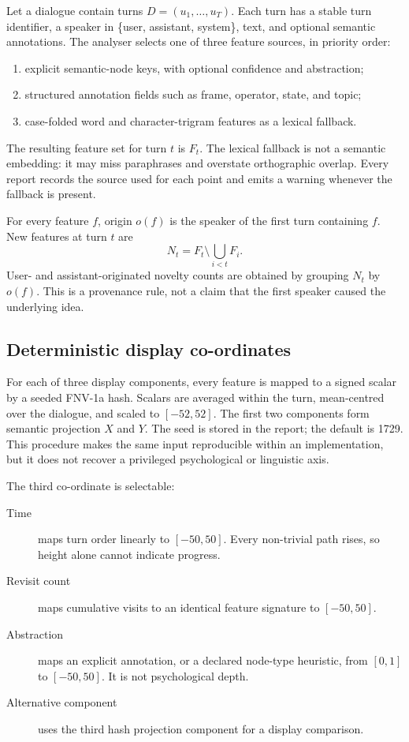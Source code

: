 \documentclass[11pt]{article}
\begin{document}
Let a dialogue contain turns $D=(u_1,\ldots,u_T)$. Each turn has a stable turn
identifier, a speaker in \{user, assistant, system\}, text, and optional semantic
annotations. The analyser selects one of three feature sources, in priority
order:

\begin{enumerate}
  \item explicit semantic-node keys, with optional confidence and abstraction;
  \item structured annotation fields such as frame, operator, state, and topic;
  \item case-folded word and character-trigram features as a lexical fallback.
\end{enumerate}

The resulting feature set for turn $t$ is $F_t$. The lexical fallback is not a
semantic embedding: it may miss paraphrases and overstate orthographic overlap.
Every report records the source used for each point and emits a warning whenever
the fallback is present.

For every feature $f$, origin $o(f)$ is the speaker of the first turn containing
$f$. New features at turn $t$ are
\begin{equation}
N_t = F_t \setminus \bigcup_{i<t}F_i.
\end{equation}
User- and assistant-originated novelty counts are obtained by grouping $N_t$ by
$o(f)$. This is a provenance rule, not a claim that the first speaker caused the
underlying idea.

\subsection{Deterministic display co-ordinates}

For each of three display components, every feature is mapped to a signed scalar
by a seeded FNV-1a hash. Scalars are averaged within the turn, mean-centred over
the dialogue, and scaled to $[-52,52]$. The first two components form semantic
projection $X$ and $Y$. The seed is stored in the report; the default is 1729.
This procedure makes the same input reproducible within an implementation, but
it does not recover a privileged psychological or linguistic axis.

The third co-ordinate is selectable:

\begin{description}
  \item[Time] maps turn order linearly to $[-50,50]$. Every non-trivial path
        rises, so height alone cannot indicate progress.
  \item[Revisit count] maps cumulative visits to an identical feature signature
        to $[-50,50]$.
  \item[Abstraction] maps an explicit annotation, or a declared node-type
        heuristic, from $[0,1]$ to $[-50,50]$. It is not psychological depth.
  \item[Alternative component] uses the third hash projection component for a
        display comparison.
\end{description}
\end{document}
